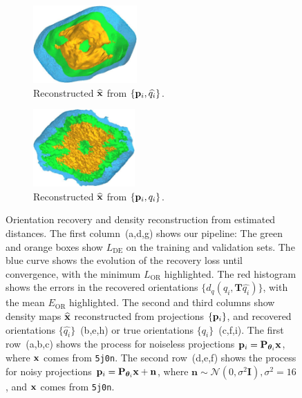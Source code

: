 \begin{figure}[t]
    \hfill
    \begin{subfigure}[b]{0.26\linewidth}
        \centering
        \includegraphics[height=8em]{figures/5a1a_aligned}
        \caption{Reconstructed $\widehat{\mathbf{x}}$ from $\{ \mathbf{p}_i, \widehat{q_i} \}$.}%
        \label{fig:5a1a-noise0-reconstruction-recovered}
    \end{subfigure}
    \hfill
    \begin{subfigure}[b]{0.26\linewidth}
        \centering
        \includegraphics[height=8em]{figures/5a1a_ground_truth}
        \caption{Reconstructed $\widehat{\mathbf{x}}$ from $\{ \mathbf{p}_i, q_i \}$.}%
        \label{fig:5a1a-noise0-reconstruction-true}
    \end{subfigure}
    \caption{%
        Orientation recovery and density reconstruction from estimated distances.
        The first column~(a,d,g) shows our pipeline:
        The green and orange boxes show $L_\text{DE}$  on the training and validation sets.
        The blue curve shows the evolution of the recovery loss until convergence, with the minimum $L_\text{OR}$  highlighted.
        The red histogram shows the errors in the recovered orientations $\{d_q(q_i, \mathbf{T}\widehat{q_i})\}$, with the mean $E_\text{OR}$  highlighted.
    The second and third columns show density maps $\widehat{\mathbf{x}}$ reconstructed from projections $\{ \mathbf{p}_i \}$, and recovered orientations $\{ \widehat{q_i} \}$~(b,e,h) or true orientations $\{ q_i \}$~(c,f,i).
        The first row~(a,b,c) shows the process for noiseless projections $\mathbf{p}_i = \mathbf{P}_{{\boldsymbol{\theta}}_i} \mathbf{x}$, where $\mathbf{x}$ comes from \texttt{5j0n}.
        The second row~(d,e,f) shows the process for noisy projections $\mathbf{p}_i = \mathbf{P}_{{\boldsymbol{\theta}}_i} \mathbf{x} + \mathbf{n}$, where $\mathbf{n} \sim \mathcal{N}(0, \sigma^2\mathbf{I}), \sigma^2=16$, and $\mathbf{x}$ comes from \texttt{5j0n}.
}
\end{figure}
